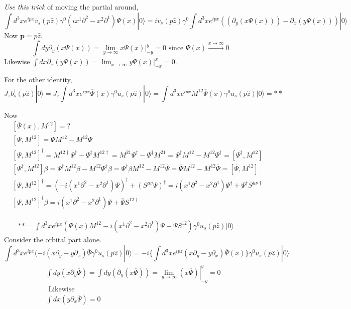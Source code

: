 \documentclass[twoside]{amsart}
\begin{document}
\emph{Use this trick} of moving the partial around, 
\[
\int d^3 x e^{ipx} \overline{v}_s(p\hat{z})\gamma^0 (i x^1 \partial^2 - x^2 \partial^1)\Psi(x) |0 \rangle = i v_s(p\hat{z}) \gamma^0 \int d^3 x e^{ipx} ( (\partial_y (x \Psi(x)) ) - \partial_x(y \Psi(x)) )| 0 \rangle 
\]
Now $\mathbf{p} = p\hat{z}$.  
\[
\int dy \partial_y(x \Psi(x)) = \lim_{y\to \infty} \left. x \Psi(x) \right|_{-y}^y = 0 \text{ since } \Psi(x) \xrightarrow{x\to \infty} 0 
\]
Likewise $\int dx \partial_x(y \Psi(x)) = \lim_{x\to \infty} \left. y \Psi(x) \right|_{-x}^x = 0$.  

For the other identity, 
\[
J_z b_s^{\dag}(p\hat{z}) | 0 \rangle = J_z \int d^3x e^{ipx} \overline{\Psi}(x) \gamma^0 u_s(p\hat{z}) |0\rangle = \int d^3x e^{ipx} M^{12} \overline{\Psi}(x) \gamma^0 u_s(p\hat{z}) |0 \rangle = ** 
\]

Now
\[
\begin{aligned}
& [\overline{\Psi}(x), M^{12}] = ? \\
& [\Psi,M^{12}] = \Psi M^{12} - M^{12}\Psi \\
& [\Psi,M^{12}]^{\dag} = M^{12\dag} \Psi^{\dag} - \Psi^{\dag}M^{12\dag} = M^{21}\Psi^{\dag} - \Psi^{\dag} M^{21} = \Psi^{\dag} M^{12} - M^{12} \Psi^{\dag} = [\Psi^{ \dag}, M^{12} ] \\ 
& [\Psi^{\dag}, M^{12} ]\beta = \Psi^{\dag}M^{12} \beta - M^{12} \Psi^{\dag} \beta = \Psi^{\dag} \beta M^{12} - M^{12} \overline{\Psi} = \overline{\Psi}M^{12} - M^{12} \overline{\Psi} = [ \overline{\Psi}, M^{12} ] \\
& [\Psi, M^{12}]^{\dag} = (-i (x^1 \partial^2 - x^2 \partial^1) \Psi)^{\dag} + (S^{\mu \nu}\Psi)^{\dag} = i (x^1 \partial^2 - x^2 \partial^1 )\Psi^{\dag} + \Psi^{\dag} S^{\mu \nu \dag} \\ 
& [\Psi,M^{12}]^{\dag} \beta = i (x^1 \partial^2 - x^2 \partial^1)\Psi + \overline{\Psi} S^{12 \dag}
\end{aligned}
\]

\[
\begin{aligned}
  **  = \int d^3x e^{ipx} (\overline{\Psi}(x) M^{12} - i(x^1 \partial^2 - x^2 \partial^1) \overline{\Psi} - \overline{\Psi} S^{12} ) \gamma^0 u_s(p\hat{z}) |0 \rangle = 
\end{aligned}
\]
Consider the orbital part alone.
\[
\int d^3x e^{ipx} (-i(x\partial_y - y \partial_x )\overline{\Psi} \gamma^0 u_s(p\hat{z}) |0 \rangle = - i \lbrace \int d^3x e^{ipz}(x\partial_y - y \partial_x)\overline{\Psi}(x) \rbrace \gamma^0 u_s(p\hat{z}) |0\rangle 
\]
\[
\begin{aligned}
  & \int dy (x \partial_y \overline{\Psi} ) = \int dy (\partial_y (x\overline{\Psi}) ) = \left. \lim_{y\to \infty} (x \overline{\Psi}) \right|_{-y}^{y} = 0 \\ 
  & \text{ Likewise } \\ 
  & \int dx (y \partial_x \overline{\Psi} ) = 0 
\end{aligned}
\]
\end{document}
